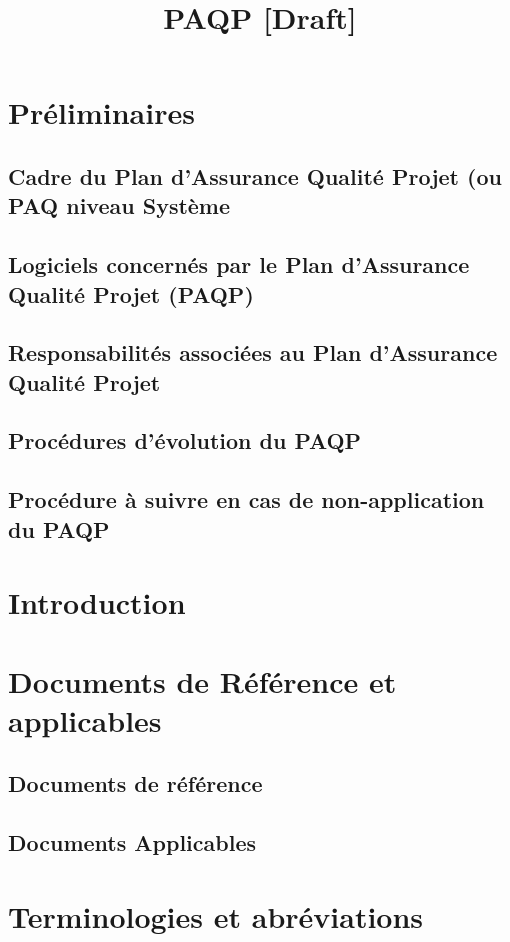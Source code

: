 \documentclass[a4paper]{article}
\begin{document}
\title{PAQP [Draft]}
\maketitle


\section{Préliminaires}
\subsection{Cadre du Plan d'Assurance Qualité Projet (ou PAQ niveau Système}
\subsection{Logiciels concernés par le Plan d'Assurance Qualité Projet (PAQP)}
\subsection{Responsabilités associées au Plan d'Assurance Qualité Projet}
\subsection{Procédures d'évolution du PAQP}
\subsection{Procédure à suivre en cas de non-application du  PAQP}

\section{Introduction}

\section{Documents de Référence et applicables}
\subsection{Documents de référence}
\subsection{Documents Applicables}

\section{Terminologies et abréviations}
\end{document}
